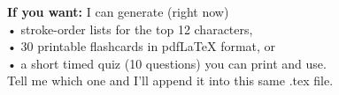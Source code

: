 \begin{CJK}{UTF8}{gbsn}
\bigskip
\noindent\textbf{If you want:} I can generate (right now) \\
\quad • stroke-order lists for the top 12 characters, \\
\quad • 30 printable flashcards in pdfLaTeX format, or \\
\quad • a short timed quiz (10 questions) you can print and use. \\
Tell me which one and I’ll append it into this same .tex file.

\end{CJK}